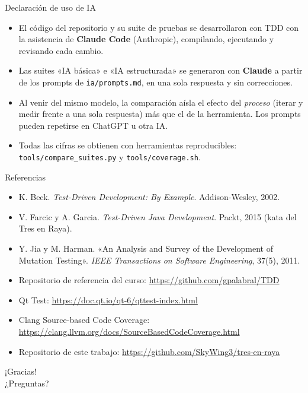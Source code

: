 \documentclass[aspectratio=169,10pt]{beamer}
\begin{document}
\begin{frame}{Declaración de uso de IA}
  \small
  \begin{itemize}
    \item El código del repositorio y su suite de pruebas se desarrollaron con TDD con la asistencia de
      \textbf{Claude Code} (Anthropic), compilando, ejecutando y revisando cada cambio.
    \item Las suites «IA básica» e «IA estructurada» se generaron con \textbf{Claude} a partir de los prompts
      de \texttt{ia/prompts.md}, en una sola respuesta y sin correcciones.
    \item Al venir del mismo modelo, la comparación aísla el efecto del \emph{proceso} (iterar y medir frente a
      una sola respuesta) más que el de la herramienta. Los prompts pueden repetirse en ChatGPT u otra IA.
    \item Todas las cifras se obtienen con herramientas reproducibles: \texttt{tools/compare\_suites.py} y
      \texttt{tools/coverage.sh}.
  \end{itemize}
\end{frame}

\begin{frame}{Referencias}
  \footnotesize
  \begin{itemize}
    \item K. Beck. \emph{Test-Driven Development: By Example}. Addison-Wesley, 2002.
    \item V. Farcic y A. Garcia. \emph{Test-Driven Java Development}. Packt, 2015 (kata del Tres en Raya).
    \item Y. Jia y M. Harman. «An Analysis and Survey of the Development of Mutation Testing».
      \emph{IEEE Transactions on Software Engineering}, 37(5), 2011.
    \item Repositorio de referencia del curso: \url{https://github.com/gpalabral/TDD}
    \item Qt Test: \url{https://doc.qt.io/qt-6/qttest-index.html}
    \item Clang Source-based Code Coverage: \url{https://clang.llvm.org/docs/SourceBasedCodeCoverage.html}
    \item Repositorio de este trabajo: \url{https://github.com/SkyWing3/tres-en-raya}
  \end{itemize}
\end{frame}

\begin{frame}[standout]
  ¡Gracias!\\[6pt]
  {\normalsize ¿Preguntas?}
\end{frame}
\end{document}
